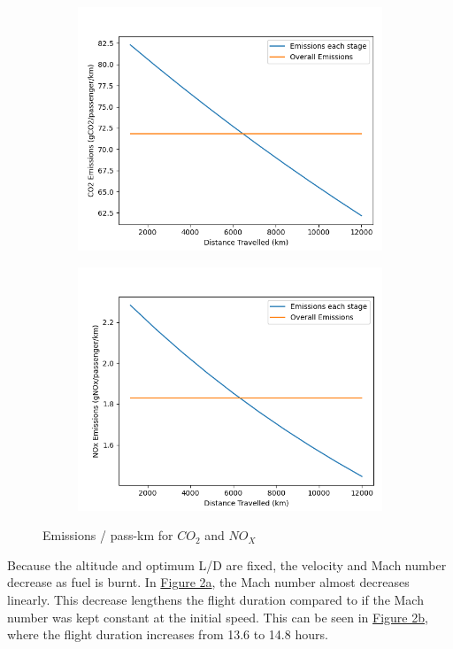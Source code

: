 \documentclass[12pt, a4paper]{article}
\begin{document}
\captionsetup[figure]{aboveskip=-1cm,belowskip=-0.5cm}
\begin{figure}[H]
	\begin{subfigure}[b]{0.5\textwidth}
		\centering
		\includegraphics[width=\textwidth]{../Plots/co2 9.5 45}
		\label{fig:co2}
	\end{subfigure}
	\hfill
	\begin{subfigure}[b]{0.5\textwidth}
		\centering
		\includegraphics[width=\textwidth]{../Plots/nox 9.5 45}
		\label{fig:nox}
	\end{subfigure}
	\hfill
	\caption{Emissions / pass-km for $CO_2$ and $NO_X$}
	\label{fig:emission}
\end{figure}
\captionsetup[figure]{aboveskip=1pt,belowskip=1pt}
Because the altitude and optimum L/D are fixed, the velocity and Mach number decrease as fuel is burnt. In \hyperref[fig:mach]{Figure 2a}, the Mach number almost decreases linearly. This decrease lengthens the flight duration compared to if the Mach number was kept constant at the initial speed. This can be seen in \hyperref[fig:xt]{Figure 2b}, where the flight duration increases from 13.6 to 14.8 hours.
\end{document}

